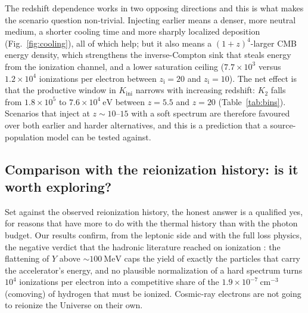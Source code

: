 \documentclass[twocolumn]{article}
\newcommand{\Kini}{K_{\mathrm{ini}}}
\newcommand{\zi}{z_{\mathrm{i}}}
\begin{document}
The redshift dependence works in two opposing directions and this is what makes
the scenario question non-trivial. Injecting earlier means a denser, more
neutral medium, a shorter cooling time and more sharply localized deposition
(Fig.~\ref{fig:cooling}), all of which help; but it also means a
$(1+z)^{4}$-larger CMB energy density, which strengthens the inverse-Compton
sink that steals energy from the ionization channel, and a lower saturation
ceiling ($7.7\times10^{3}$ versus $1.2\times10^{4}$ ionizations per electron
between $\zi = 20$ and $\zi = 10$). The net effect is that the productive
window in $\Kini$ narrows with increasing redshift: $K_2$ falls from
$1.8\times10^{5}$ to $7.6\times10^{4}\ \mathrm{eV}$ between $z = 5.5$ and
$z = 20$ (Table~\ref{tab:bins}). Scenarios that inject at $z \sim 10$--$15$
with a soft spectrum are therefore favoured over both earlier and harder
alternatives, and this is a prediction that a source-population model can be
tested against.

\subsection{Comparison with the reionization history: is it worth exploring?}
\label{sec:outlook}

Set against the observed reionization history, the honest answer is a qualified
yes, for reasons that have more to do with the thermal history than with the
photon budget. Our results confirm, from the leptonic side and with the full
loss physics, the negative verdict that the hadronic literature reached on
ionization \citep{Leite2017}: the flattening of $Y$ above
$\sim\!100\ \mathrm{MeV}$ caps the yield of exactly the particles that carry
the accelerator's energy, and no plausible normalization of a hard spectrum
turns $10^{4}$ ionizations per electron into a competitive share of the
$1.9\times10^{-7}\ \mathrm{cm^{-3}}$ (comoving) of hydrogen that must be
ionized. Cosmic-ray electrons are not going to reionize the Universe on their
own.
\end{document}
